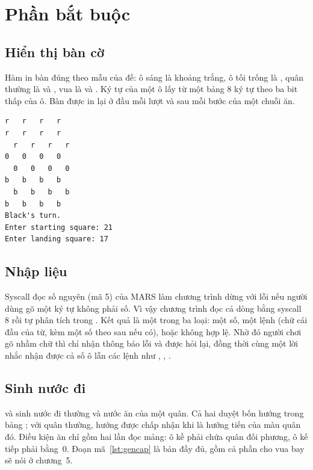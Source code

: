 \chapter{Phần bắt buộc}

\section{Hiển thị bàn cờ}

Hàm  in bàn đúng theo mẫu của đề: ô sáng là khoảng trắng, ô tối trống là , quân thường là  và , vua là  và . Ký tự của một ô lấy từ một bảng 8 ký tự theo ba bit thấp của ô. Bàn được in lại ở đầu mỗi lượt và sau mỗi bước của một chuỗi ăn.

\begin{lstlisting}[style=screen,caption={Bàn cờ khi bắt đầu và lời nhắc nhập nước đi}]
  r   r   r   r
r   r   r   r
  r   r   r   r
0   0   0   0
  0   0   0   0
b   b   b   b
  b   b   b   b
b   b   b   b
Black's turn.
Enter starting square: 21
Enter landing square: 17
\end{lstlisting}

\section{Nhập liệu}

Syscall đọc số nguyên (mã 5) của MARS làm chương trình dừng với lỗi nếu người dùng gõ một ký tự không phải số. Vì vậy chương trình đọc cả dòng bằng syscall 8 rồi tự phân tích trong . Kết quả là một trong ba loại: một số, một lệnh (chữ cái đầu của từ, kèm một số theo sau nếu có), hoặc không hợp lệ. Nhờ đó người chơi gõ nhầm chữ thì chỉ nhận thông báo lỗi và được hỏi lại, đồng thời cùng một lời nhắc nhận được cả số ô lẫn các lệnh như , , .

\section{Sinh nước đi}

 và  sinh nước đi thường và nước ăn của một quân. Cả hai duyệt bốn hướng trong bảng ; với quân thường, hướng được chấp nhận khi là hướng tiến của màu quân đó. Điều kiện ăn chỉ gồm hai lần đọc mảng: ô kề phải chứa quân đối phương, ô kế tiếp phải bằng~0. Đoạn mã~\ref{lst:gencap} là bản đầy đủ, gồm cả phần cho vua bay sẽ nói ở chương~5.



